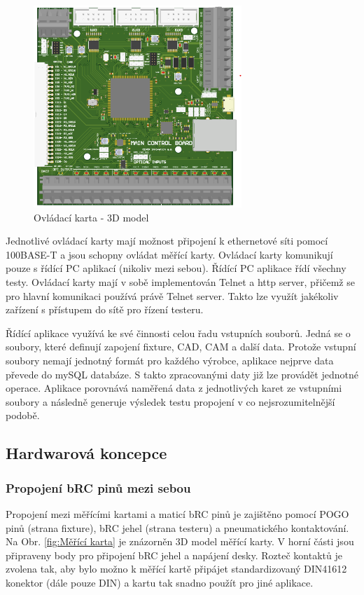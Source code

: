     \begin{figure}[ht!]
        \centering
        \includegraphics[width = 0.7\textwidth]{obrazky/3D_ovl_karta.png}
        \caption{Ovládací karta - 3D model}
        \label{fig:Ovládací karta - 3D model}
    \end{figure}
    Jednotlivé ovládací karty mají možnost připojení k ethernetové síti pomocí
    \mbox{100BASE-T} a jsou schopny ovládat měřící karty.
    Ovládací karty komunikují pouze s řídící PC aplikací (nikoliv mezi sebou).
    Řídící PC aplikace řídí všechny testy. Ovládací karty mají v sobě implementován Telnet a http server,
    přičemž se pro hlavní komunikaci používá právě Telnet server.
    Takto lze využít jakékoliv zařízení s přístupem do sítě pro řízení testeru.\par
    
    Řídící aplikace využívá ke své činnosti celou řadu vstupních souborů. Jedná se o soubory, které definují zapojení fixture, CAD, CAM a další data\cite{CAD_wiki}.
    Protože vstupní soubory nemají jednotný formát pro každého výrobce, aplikace nejprve data převede do mySQL databáze. S takto zpracovanými daty již lze
    provádět jednotné operace. Aplikace porovnává naměřená data z jednotlivých karet ze vstupními soubory a následně generuje výsledek testu propojení
    v co nejsrozumitelnější podobě.

    \subsection{Hardwarová koncepce}
    \subsubsection{Propojení bRC pinů mezi sebou}
    Propojení mezi měřícími kartami a maticí bRC pinů je zajištěno pomocí POGO pinů (strana fixture),
    bRC jehel (strana testeru) a pneumatického kontaktování.
    Na Obr. \ref{fig:Měřící karta} je znázorněn 3D model měřící karty. V horní části jsou připraveny 
    body pro připojení bRC jehel a napájení desky. Rozteč kontaktů je zvolena tak, aby bylo možno
    k měřící kartě připájet standardizovaný DIN41612 konektor (dále pouze DIN) a kartu tak snadno použít pro jiné aplikace.\par

